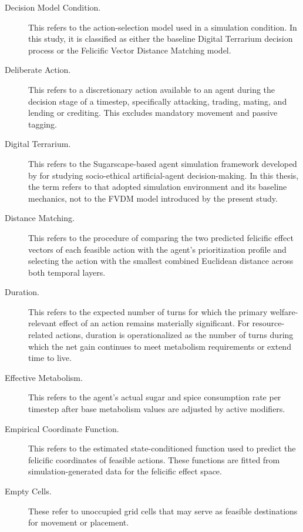 \documentclass{icsthesis}
\begin{document}
\begin{mainmatter}
\begin{description}
\item[Decision Model Condition.] This refers to the action-selection model used in a simulation condition. In this study, it is classified as either the baseline Digital Terrarium decision process or the Felicific Vector Distance Matching model.

\item[Deliberate Action.] This refers to a discretionary action available to an agent during the decision stage of a timestep, specifically attacking, trading, mating, and lending or crediting. This excludes mandatory movement and passive tagging.

\item[Digital Terrarium.] This refers to the Sugarscape-based agent simulation framework developed by \citet{KremerHerman2024b} for studying socio-ethical artificial-agent decision-making. In this thesis, the term refers to that adopted simulation environment and its baseline mechanics, not to the FVDM model introduced by the present study.

\item[Distance Matching.] This refers to the procedure of comparing the two predicted felicific effect vectors of each feasible action with the agent's prioritization profile and selecting the action with the smallest combined Euclidean distance across both temporal layers.

\item[Duration.] This refers to the expected number of turns for which the primary welfare-relevant effect of an action remains materially significant. For resource-related actions, duration is operationalized as the number of turns during which the net gain continues to meet metabolism requirements or extend time to live.

\item[Effective Metabolism.] This refers to the agent's actual sugar and spice consumption rate per timestep after base metabolism values are adjusted by active modifiers.

\item[Empirical Coordinate Function.] This refers to the estimated state-conditioned function used to predict the felicific coordinates of feasible actions. These functions are fitted from simulation-generated data for the felicific effect space.

\item[Empty Cells.] These refer to unoccupied grid cells that may serve as feasible destinations for movement or placement.


\end{description}
\end{mainmatter}
\end{document}
